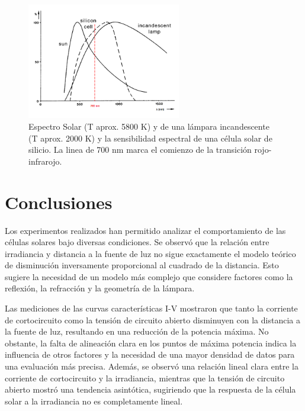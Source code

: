  \begin{figure}[H]
 	\centering
 	\includegraphics[width=0.6\textwidth]{grafico08_respuesta_espectral.png}
 	\caption{Espectro Solar (T aprox. 5800 K) y de una lámpara incandescente (T aprox. 2000 K) y la
 		sensibilidad espectral de una célula solar de silicio. La linea de 700 nm marca el comienzo de la transición rojo-infrarojo.}
 	\label{fig:Respuesta_espectral}
 \end{figure}

\section{Conclusiones}


Los experimentos realizados han permitido analizar el comportamiento de las células solares bajo diversas condiciones. Se observó que la relación entre irradiancia y distancia a la fuente de luz no sigue exactamente el modelo teórico de disminución inversamente proporcional al cuadrado de la distancia. Esto sugiere la necesidad de un modelo más complejo que considere factores como la reflexión, la refracción y la geometría de la lámpara.

\vspace{\baselineskip}	

Las mediciones de las curvas características I-V mostraron que tanto la corriente de cortocircuito como la tensión de circuito abierto disminuyen con la distancia a la fuente de luz, resultando en una reducción de la potencia máxima. No obstante, la falta de alineación clara en los puntos de máxima potencia indica la influencia de otros factores y la necesidad de una mayor densidad de datos para una evaluación más precisa. Además, se observó una relación lineal clara entre la corriente de cortocircuito y la irradiancia, mientras que la tensión de circuito abierto mostró una tendencia asintótica, sugiriendo que la respuesta de la célula solar a la irradiancia no es completamente lineal.

